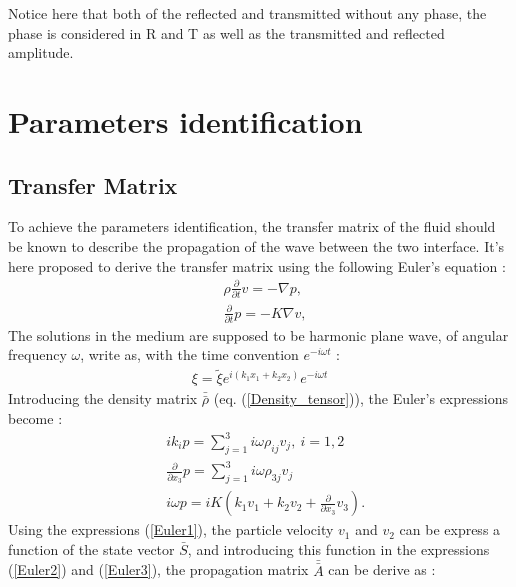 \documentclass{article}
\begin{document}
    Notice here that both of the reflected and transmitted without any phase, the phase is considered in R and T as well as the transmitted and reflected amplitude.
    
\section{Parameters identification}
\subsection{Transfer Matrix}
    To achieve the parameters identification, the transfer matrix of the fluid should be known to describe the propagation of the wave between the two interface. It's here proposed to derive the transfer matrix using the following Euler's equation :
    \begin{align}
        &\rho \frac{\partial}{\partial t}v=-\nabla p, \\
	    &\frac{\partial}{\partial t}p=-K\nabla v,
    \end{align}
    The solutions in the medium are supposed to be harmonic plane wave, of angular frequency $\omega$, write as, with the time convention $e^{-i\omega t}$ :
    \begin{align}
        \xi=\tilde{\xi}e^{i(k_1 x_1+k_2 x_2)}e^{-i\omega t}
    \end{align}
    Introducing the density matrix $\bar{\bar{\rho}}$ (eq. (\ref{Density_tensor})), the Euler's expressions become :
    \begin{align}
	    &ik_ip=\sum_{j=1}^{3} i \omega \rho_{ij} v_j,\ i=1,2\label{Euler1}\\
	    &\frac{\partial}{\partial x_3}p=\sum_{j=1}^{3} i \omega \rho_{3j} v_j\label{Euler2}\\
        &i\omega p= iK(k_1v_1+k_2v_2+\frac{\partial}{\partial x_3}v_3).\label{Euler3}
    \end{align}
    Using the expressions (\ref{Euler1}), the particle velocity $v_1$ and $v_2$ can be express a function of the state vector $\bar{S}$, and introducing this function in the expressions (\ref{Euler2}) and (\ref{Euler3}), the propagation matrix $\bar{\bar{A}}$ can be derive as :
\end{document}
